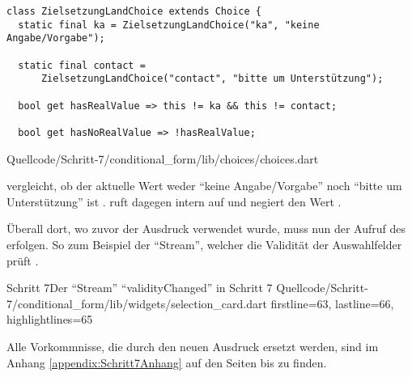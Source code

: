 \ifIncludeFigures
  \begin{listing}[htbp]
    \let\oldtheFancyVerbLine\theFancyVerbLine
    \renewcommand\theFancyVerbLine{%
      \ifnum\value{FancyVerbLine}=187
      \setcounter{FancyVerbLine}{197}
      \else
      \oldtheFancyVerbLine%
      \fi
    }
    \begin{verbatim}
class ZielsetzungLandChoice extends Choice {
  static final ka = ZielsetzungLandChoice("ka", "keine Angabe/Vorgabe");

  static final contact =
      ZielsetzungLandChoice("contact", "bitte um Unterstützung");

  bool get hasRealValue => this != ka && this != contact;

  bool get hasNoRealValue => !hasRealValue;
\end{verbatim}
     {Quellcode/Schritt-7/conditional_form/lib/choices/choices.dart}
    \label{lst:Schritt7ZielsetzungLandChoice}
  \end{listing}
\fi


 vergleicht, ob der aktuelle Wert weder \enquote{keine Angabe/Vorgabe} noch \enquote{bitte um Unterstützung} ist .
 ruft dagegen intern  auf und negiert den Wert .


Überall dort, wo zuvor der Ausdruck  verwendet wurde, muss nun der Aufruf des  erfolgen.
So zum Beispiel der \enquote{Stream}, welcher die Validität der Auswahlfelder prüft \Lst{\ref{lst:Schritt7validityChangedchoiceMatcher}}.
\begin{alexlisting}{Schritt 7}{Der \enquote{Stream} \enquote{validityChanged} in Schritt 7}
  {Quellcode/Schritt-7/conditional_form/lib/widgets/selection_card.dart}
  {firstline=63, lastline=66, highlightlines={65}}
  \label{lst:Schritt7validityChangedchoiceMatcher}
  \end{alexlisting}

Alle Vorkommnisse, die durch den neuen Ausdruck ersetzt werden,
sind im Anhang \ref{appendix:Schritt7Anhang} auf den Seiten \pageref{lst:Schritt7validityChangedStreamBuilderChoiceMatcher}
bis \pageref{lst:Schritt7validateChoices} zu finden.
